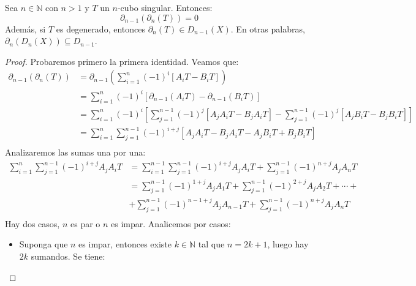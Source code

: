 \documentclass[12pt]{report}
\newcounter{it}
\theoremstyle{largebreak}
\begin{document}
    \begin{propo}
        Sea $n\in\mathbb{N}$ con $n>1$ y $T$ un $n$-cubo singular. Entonces:
        \begin{equation*}
            \partial_{ n-1}\left(\partial_n\left(T\right) \right)=0
        \end{equation*}
        Además, si $T$ es degenerado, entonces $\partial_n\left(T\right)\in D_{ n-1}(X)$. En otras palabras, $\partial_n(D_n(X))\subseteq D_{n-1}$. 
    \end{propo}

    \begin{proof}
        Probaremos primero la primera identidad. Veamos que:
        \begin{equation*}
            \begin{split}
                \partial_{ n-1}\left(\partial_n\left(T\right) \right)&=\partial_{ n-1}\left(\sum_{ i=1}^n (-1)^i\left[A_iT-B_iT \right] \right)\\
                &=\sum_{ i=1}^n (-1)^i\left[\partial_{ n-1}\left(A_iT\right)-\partial_{ n-1}\left(B_iT\right)\right]\\
                &=\sum_{ i=1}^n (-1)^i\left[\sum_{ j=1}^{n-1} (-1)^j\left[A_jA_iT-B_jA_iT \right]-\sum_{ j=1}^{n-1} (-1)^j\left[A_jB_iT-B_jB_iT \right]\right]\\
                &=\sum_{ i=1}^n \sum_{ j=1}^{n-1}(-1)^{i+j} \left[A_jA_iT-B_jA_iT-A_jB_iT+B_jB_iT\right]\\
            \end{split}
        \end{equation*}
        Analizaremos las sumas una por una:
        \begin{equation*}
            \begin{split}
                \sum_{ i=1}^n \sum_{ j=1}^{n-1}(-1)^{i+j}A_jA_iT&=\sum_{ i=1}^{ n-1}\sum_{ j=1}^{n-1}(-1)^{i+j}A_jA_iT+\sum_{ j=1}^{n-1}(-1)^{n+j}A_jA_nT\\
                &=\sum_{ j=1}^{n-1}(-1)^{1+j}A_jA_1T+\sum_{ j=1}^{n-1}(-1)^{2+j}A_jA_2T+\cdots+\\
                &+\sum_{ j=1}^{n-1}(-1)^{n-1+j}A_jA_{ n-1}T+\sum_{ j=1}^{n-1}(-1)^{n+j}A_jA_nT\\
            \end{split}
        \end{equation*}
        Hay dos casos, $n$ es par o $n$ es impar. Analicemos por casos:
        \begin{itemize}
            \item Suponga que $n$ es impar, entonces existe $k\in\mathbb{N}$ tal que $n=2k+1$, luego hay $2k$ sumandos. Se tiene:

\end{itemize}
\end{proof}
\end{document}
